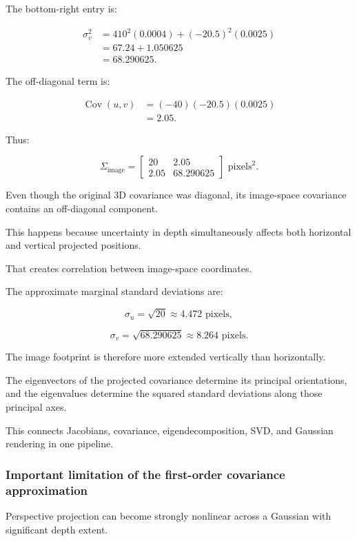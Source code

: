The bottom-right entry is:

\[
\begin{aligned} \sigma_v^2 &=410^2(0.0004)+(-20.5)^2(0.0025)\\ &=67.24+1.050625\\ &=\boxed{68.290625}. \end{aligned}
\]

The off-diagonal term is:

\[
\begin{aligned} \operatorname{Cov}(u,v) &=(-40)(-20.5)(0.0025)\\ &=\boxed{2.05}. \end{aligned}
\]

Thus:

\[
\boxed{ \Sigma_{\text{image}}= \begin{bmatrix} 20&2.05\\ 2.05&68.290625 \end{bmatrix} \text{ pixels}^2 }.
\]

Even though the original 3D covariance was diagonal, its image-space covariance contains an off-diagonal component.

This happens because uncertainty in depth simultaneously affects both horizontal and vertical projected positions.

That creates correlation between image-space coordinates.

The approximate marginal standard deviations are:

\[
\sigma_u=\sqrt{20}\approx4.472\text{ pixels},
\]

\[
\sigma_v=\sqrt{68.290625}\approx8.264\text{ pixels}.
\]

The image footprint is therefore more extended vertically than horizontally.

The eigenvectors of the projected covariance determine its principal orientations, and the eigenvalues determine the squared standard deviations along those principal axes.

This connects Jacobians, covariance, eigendecomposition, SVD, and Gaussian rendering in one pipeline.

\subsubsection{Important limitation of the first-order covariance approximation}\label{02-foundations-ii-ch021-important-limitation-of-the-first-order-covariance-approximation}

Perspective projection can become strongly nonlinear across a Gaussian with significant depth extent.

